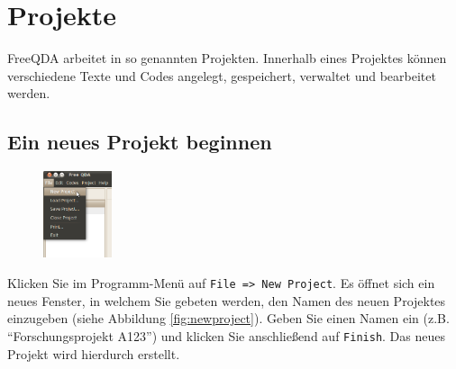 \chapter{Projekte}
FreeQDA arbeitet in so genannten Projekten. Innerhalb eines Projektes können verschiedene Texte und Codes angelegt, gespeichert, verwaltet und %
bearbeitet werden.


\section{Ein neues Projekt beginnen}
\begin{figure}
 \vspace{-28pt}
 \begin{center}
    \includegraphics[width=0.18\textwidth]{img/newproject}
  \end{center}
 
  \vspace{12pt}
\end{figure}
Klicken Sie im Programm-Menü auf \texttt{File => New Project}. Es öffnet sich ein neues Fenster, in welchem Sie gebeten werden, den %
Namen des neuen Projektes einzugeben (siehe Abbildung \ref{fig:newproject}). Geben Sie einen Namen ein (z.B. ``Forschungsprojekt A123'') %
und klicken Sie anschließend auf \texttt{Finish}. Das neues Projekt wird hierdurch erstellt. 

